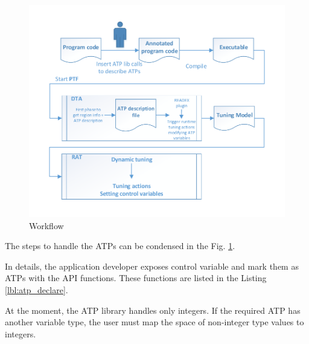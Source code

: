 \begin{figure}
\centering
\includegraphics[width=0.8\columnwidth]{figures/overall_design.pdf} 
\caption{Workflow }
\label{fig_ATP_workflow}
\end{figure} 

The steps to handle the ATPs can be condensed in the Fig. \ref{fig_ATP_workflow}.

In details, the application developer exposes control variable and mark them as ATPs with the API functions. These functions are listed in the Listing \ref{lbl:atp_declare}.


At the moment, the ATP library handles only integers. If the required ATP has another variable type, the user must map the space of non-integer type values to integers.

